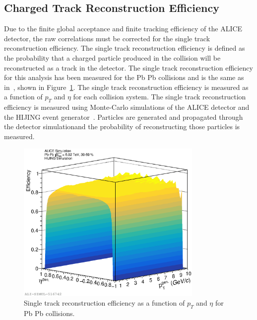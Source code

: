 \subsection*{Charged Track Reconstruction Efficiency}

Due to the finite global acceptance and finite tracking efficiency of the ALICE detector, the raw correlations must be corrected for the single track reconstruction efficiency. The single track reconstruction efficiency is defined as the probability that a charged particle produced in the collision will be reconstructed as a track in the detector. The single track reconstruction efficiency for this analysis has been measured for the Pb Pb collisions and is the same as in~\cite{CharlesThesis}, shown in Figure~\ref{fig:STRE}. The single track reconstruction efficiency is measured as a function of $p_T$ and $\eta$ for each collision system. The single track reconstruction efficiency is measured using Monte-Carlo simulations of the ALICE detector and the HIJING event generator~\cite{HIJING}. Particles are generated and propagated through the detector simulationand the probability of reconstructing those particles is measured.  

\begin{figure}
    \centering
    \includegraphics[width=0.8\textwidth]{figures/eps/Prelim_Approval_STRE_2.eps}
    \caption{Single track reconstruction efficiency as a function of $p_T$ and $\eta$ for Pb Pb collisions.}\label{fig:STRE}
\end{figure}